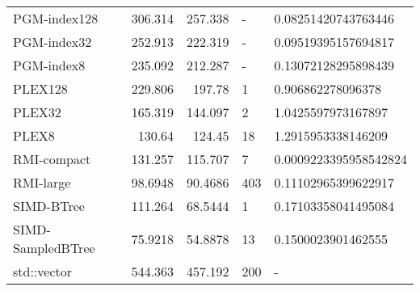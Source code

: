 \begin{tabular}{lrrll}
 PGM-index128      &               306.314  &              257.338  & -            & 0.08251420743763446   \\
 PGM-index32       &               252.913  &              222.319  & -            & 0.09519395157694817   \\
 PGM-index8        &               235.092  &              212.287  & -            & 0.13072128295898439   \\
 PLEX128           &               229.806  &              197.78   & 1            & 0.906862278096378     \\
 PLEX32            &               165.319  &              144.097  & 2            & 1.0425597973167897    \\
 PLEX8             &               130.64   &              124.45   & 18           & 1.2915953338146209    \\
 RMI-compact       &               131.257  &              115.707  & 7            & 0.0009223395958542824 \\
 RMI-large         &                98.6948 &               90.4686 & 403          & 0.11102965399622917   \\
 SIMD-BTree        &               111.264  &               68.5444 & 1            & 0.17103358041495084   \\
 SIMD-SampledBTree &                75.9218 &               54.8878 & 13           & 0.1500023901462555    \\
 std::vector       &               544.363  &              457.192  & 200          & -                     \\
\hline
\end{tabular}